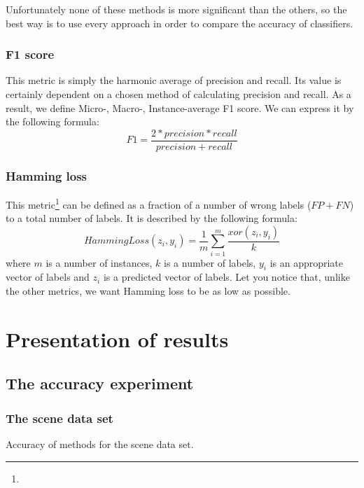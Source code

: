 \documentclass[english,a4paper,twoside]{ppfcmthesis}
\begin{document}
Unfortunately none of these methods is more significant than the others, so the best way is to use every approach in order to compare the accuracy of classifiers.  

\subsubsection{F1 score}

This metric is simply the harmonic average of precision and recall. Its value is certainly dependent on a chosen method of calculating precision and recall. As a result, we define Micro-, Macro-, Instance-average F1 score. We can express it by the following formula:
\begin{equation}\label{eq:f1}
F1=\frac{2*precision*recall}{precision+recall}   
\end{equation}

\subsubsection{Hamming loss}

This metric\footnote{} can be defined as a fraction of a number of wrong labels ($FP+FN$) to a total number of labels. It is described by the following formula:
\begin{equation}
\label{eq:exp1}
    HammingLoss(z_i, y_i)=\frac{1}{m}\sum\limits_{i=1}^{m}\frac{xor(z_i,y_i)}{k}
\end{equation}
where $m$ is a number of instances, $k$ is a number of labels, $y_{i}$ is an appropriate vector of labels  and $z_{i}$ is a predicted vector of labels. Let you notice that, unlike the other metrics, we want Hamming loss to be as low as possible.  

\section{Presentation of results}

\subsection{The accuracy experiment}\label{sec:exp_a}

\subsubsection{The scene data set}

\begin{table}[H]
\centering
\caption{Accuracy of methods for the scene data set.}
\label{tab:exp2}
\end{table}
\end{document}
